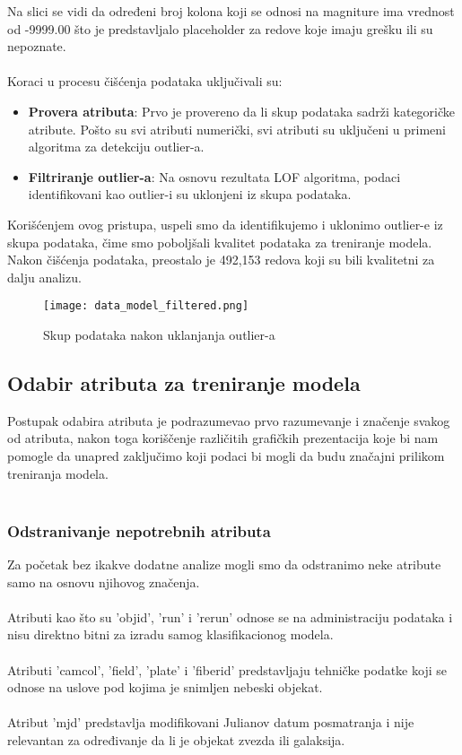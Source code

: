 \documentclass[a4paper,12pt]{article}
\begin{document}
Na slici se vidi da određeni broj kolona koji se odnosi na magniture ima vrednost od -9999.00 što je predstavljalo placeholder za redove koje imaju grešku ili su nepoznate.\\\\
Koraci u procesu čišćenja podataka uključivali su:
\begin{itemize}
    \item \textbf{Provera atributa}: Prvo je provereno da li skup podataka sadrži kategoričke atribute. Pošto su svi atributi numerički, svi atributi su uključeni u primeni algoritma za detekciju outlier-a.
    \item \textbf{Filtriranje outlier-a}: Na osnovu rezultata LOF algoritma, podaci identifikovani kao outlier-i su uklonjeni iz skupa podataka.
\end{itemize}
Korišćenjem ovog pristupa, uspeli smo da identifikujemo i uklonimo outlier-e iz skupa podataka, čime smo poboljšali kvalitet podataka za treniranje modela. Nakon čišćenja podataka, preostalo je 492,153 redova koji su bili kvalitetni za dalju analizu.

\begin{figure}[h!]
\centering
\texttt{[image: data\_model\_filtered.png]}
\caption{Skup podataka nakon uklanjanja outlier-a}
\label{fig:sql_query}
\end{figure}

\subsection{Odabir atributa za treniranje modela}

Postupak odabira atributa je podrazumevao prvo razumevanje i značenje svakog od atributa, nakon toga koriščenje različitih grafičkih prezentacija koje bi nam pomogle da unapred zaključimo koji podaci bi mogli da budu značajni prilikom treniranja modela.\\\\

\subsubsection{Odstranivanje nepotrebnih atributa}

Za početak bez ikakve dodatne analize mogli smo da odstranimo neke atribute samo na osnovu njihovog značenja.
\\\\Atributi kao što su 'objid', 'run' i 'rerun' odnose se na administraciju podataka i nisu direktno bitni za izradu samog klasifikacionog modela.
\\\\Atributi 'camcol', 'field', 'plate' i 'fiberid' predstavljaju tehničke podatke koji se odnose na uslove pod kojima je snimljen nebeski objekat.
\\\\Atribut 'mjd' predstavlja modifikovani Julianov datum posmatranja i nije relevantan za određivanje da li je objekat zvezda ili galaksija.
\end{document}
